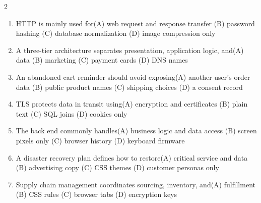 \documentclass[a4paper]{article}
\begin{document}
\begin{multicols*}{2}
\begin{enumerate}[resume]
\item HTTP is mainly used for\newline\hspace*{0.6em}(A) web request and response transfer \quad (B) password hashing \newline\hspace*{0.6em}(C) database normalization \quad (D) image compression only
\item A three-tier architecture separates presentation, application logic, and\newline\hspace*{0.6em}(A) data \quad (B) marketing \newline\hspace*{0.6em}(C) payment cards \quad (D) DNS names
\item An abandoned cart reminder should avoid exposing\newline\hspace*{0.6em}(A) another user's order data \quad (B) public product names \newline\hspace*{0.6em}(C) shipping choices \quad (D) a consent record
\item TLS protects data in transit using\newline\hspace*{0.6em}(A) encryption and certificates \quad (B) plain text \newline\hspace*{0.6em}(C) SQL joins \quad (D) cookies only
\item The back end commonly handles\newline\hspace*{0.6em}(A) business logic and data access \quad (B) screen pixels only \newline\hspace*{0.6em}(C) browser history \quad (D) keyboard firmware
\item A disaster recovery plan defines how to restore\newline\hspace*{0.6em}(A) critical service and data \quad (B) advertising copy \newline\hspace*{0.6em}(C) CSS themes \quad (D) customer personas only
\item Supply chain management coordinates sourcing, inventory, and\newline\hspace*{0.6em}(A) fulfillment \quad (B) CSS rules \newline\hspace*{0.6em}(C) browser tabs \quad (D) encryption keys

\end{enumerate}
\end{multicols*}
\end{document}
